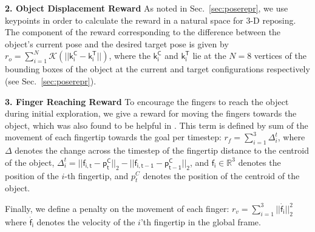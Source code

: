 \documentclass[letterpaper, 10 pt, conference]{ieeeconf}  %
\newcommand{\secref}[1]{Sec.~\ref{#1}}
\begin{document}
 \noindent \textbf{2. Object Displacement Reward} As noted in \secref{sec:poserepr}, we use keypoints in order to calculate the reward in a natural space for 3-D reposing. The component of the reward corresponding to the difference between the object's current pose and the desired target pose is given by 
 $r_o = \sum_{i=1}^N \mathcal{K}(|| \mathsf{k^C_i} - \mathsf{k^T_i} ||)$, where the $\mathsf{k^C_i}$ and $\mathsf{k^T_i}$ lie at the $N=8$ vertices of the bounding boxes of the object at the current and target configurations respectively (see \secref{sec:poserepr}).
 

 \noindent \textbf{3. Finger Reaching Reward} To encourage the fingers to reach the object during initial exploration, we give a reward for moving the fingers towards the object, which was also found to be helpful in \citep{causalworld}. This term is defined by sum of the movement of each fingertip towards the goal per timestep: $r_f = \sum_{i=1}^3 \Delta^t_i$, where $\Delta$ denotes the change across the timestep of the fingertip distance to the centroid of the object, $\Delta^t_i=||\mathsf{f_{i, t}}-\mathsf{p^C_t}||_2 - ||\mathsf{f_{i, t-1}}-\mathsf{p^C_ {t-1}}||_2$, and $\mathsf{f_i} \in \mathbb{R}^3$ denotes the position of the $i$-th fingertip, and $p_t^C$ denotes the position of the centroid of the object. 


Finally, we define a penalty on the movement of each finger: $r_v = \sum_{i=1}^3 ||\dot{\mathsf{f_i}}||_2^2$ where $\dot{\mathsf{f_i}}$ denotes the velocity of the $i$'th fingertip in the global frame.
\end{document}
